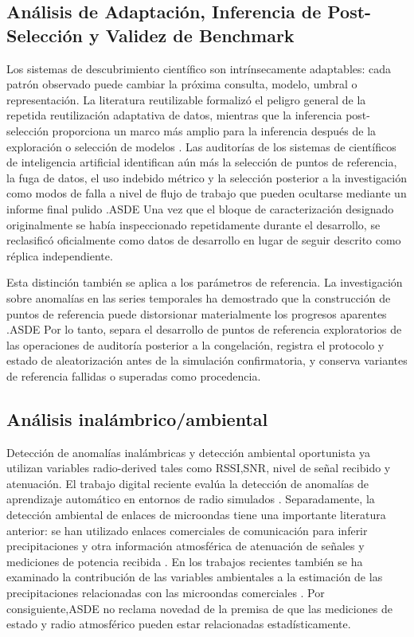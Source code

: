 \documentclass{ieeeaccess}
\begin{document}
\subsection{Análisis de Adaptación, Inferencia de Post-Selección y Validez de Benchmark}\label{anuxe1lisis-de-adaptaciuxf3n-inferencia-de-post-selecciuxf3n-y-validez-de-benchmark}

Los sistemas de descubrimiento científico son intrínsecamente adaptables: cada patrón observado puede cambiar la próxima consulta, modelo, umbral o representación. La literatura reutilizable formalizó el peligro general de la repetida reutilización adaptativa de datos, mientras que la inferencia post-selección proporciona un marco más amplio para la inferencia después de la exploración o selección de modelos \cite{REUSABLE-HOLDOUT-2015,POST-SELECTION-2022}. Las auditorías de los sistemas de científicos de inteligencia artificial identifican aún más la selección de puntos de referencia, la fuga de datos, el uso indebido métrico y la selección posterior a la investigación como modos de falla a nivel de flujo de trabajo que pueden ocultarse mediante un informe final pulido \cite{AI-SCIENTIST-PITFALLS-2025}.ASDE Una vez que el bloque de caracterización designado originalmente se había inspeccionado repetidamente durante el desarrollo, se reclasificó oficialmente como datos de desarrollo en lugar de seguir descrito como réplica independiente.

Esta distinción también se aplica a los parámetros de referencia. La investigación sobre anomalías en las series temporales ha demostrado que la construcción de puntos de referencia puede distorsionar materialmente los progresos aparentes \cite{TSAD-BENCHMARKS-2023}.ASDE Por lo tanto, separa el desarrollo de puntos de referencia exploratorios de las operaciones de auditoría posterior a la congelación, registra el protocolo y estado de aleatorización antes de la simulación confirmatoria, y conserva variantes de referencia fallidas o superadas como procedencia.

\subsection{Análisis inalámbrico/ambiental}\label{anuxe1lisis-inaluxe1mbricoambiental}

Detección de anomalías inalámbricas y detección ambiental oportunista ya utilizan variables radio-derived tales como RSSI,SNR, nivel de señal recibido y atenuación. El trabajo digital reciente evalúa la detección de anomalías de aprendizaje automático en entornos de radio simulados \cite{RADIO-DT-2025}. Separadamente, la detección ambiental de enlaces de microondas tiene una importante literatura anterior: se han utilizado enlaces comerciales de comunicación para inferir precipitaciones y otra información atmosférica de atenuación de señales y mediciones de potencia recibida \cite{MESSER-2006,LEIJNSE-2007,UIJLENHOET-2018}. En los trabajos recientes también se ha examinado la contribución de las variables ambientales a la estimación de las precipitaciones relacionadas con las microondas comerciales \cite{SPACKOVA-2025}. Por consiguiente,ASDE no reclama novedad de la premisa de que las mediciones de estado y radio atmosférico pueden estar relacionadas estadísticamente.
\end{document}
